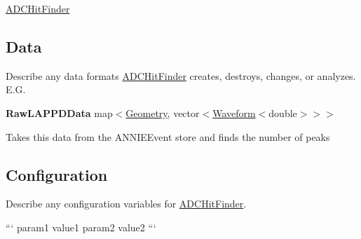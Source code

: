 \hyperlink{classADCHitFinder}{A\-D\-C\-Hit\-Finder}

\subsection*{Data}

Describe any data formats \hyperlink{classADCHitFinder}{A\-D\-C\-Hit\-Finder} creates, destroys, changes, or analyzes. E.\-G.

{\bfseries Raw\-L\-A\-P\-P\-D\-Data} {\ttfamily map$<$\hyperlink{classGeometry}{Geometry}, vector$<$\hyperlink{classWaveform}{Waveform}$<$double$>$$>$$>$}
\begin{DoxyItemize}
\item Takes this data from the {\ttfamily A\-N\-N\-I\-E\-Event} store and finds the number of peaks
\end{DoxyItemize}

\subsection*{Configuration}

Describe any configuration variables for \hyperlink{classADCHitFinder}{A\-D\-C\-Hit\-Finder}.

``` param1 value1 param2 value2 ``` 